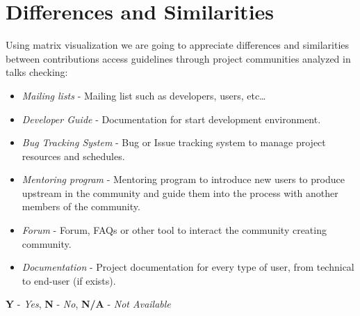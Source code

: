 \documentclass[11pt]{scrartcl}
\begin{document}
\section{Differences and Similarities}
\label{sec:differences-and-similarities}

\par Using matrix visualization we are going to appreciate differences and similarities between contributions access guidelines through project communities analyzed in talks checking:

\begin{itemize}
	\item \emph{Mailing lists} -  Mailing list such as developers, users, etc\ldots
	\item \emph{Developer Guide} - Documentation for start development environment.
	\item \emph{Bug Tracking System} - Bug or Issue tracking system to manage project resources and schedules.
	\item \emph{Mentoring program} - Mentoring program to introduce new users to produce upstream in the community and guide them into the process with another members of the community.
	\item \emph{Forum} - Forum, FAQs or other tool to interact the community creating community.
	\item \emph{Documentation} - Project documentation for every type of user, from technical to end-user (if exists).
\end{itemize}

\begin{center}
    \textbf{Y} - \emph{Yes}, \textbf{N} - \emph{No}, \textbf{N/A} - \emph{Not Available}
\end{center}
\end{document}
